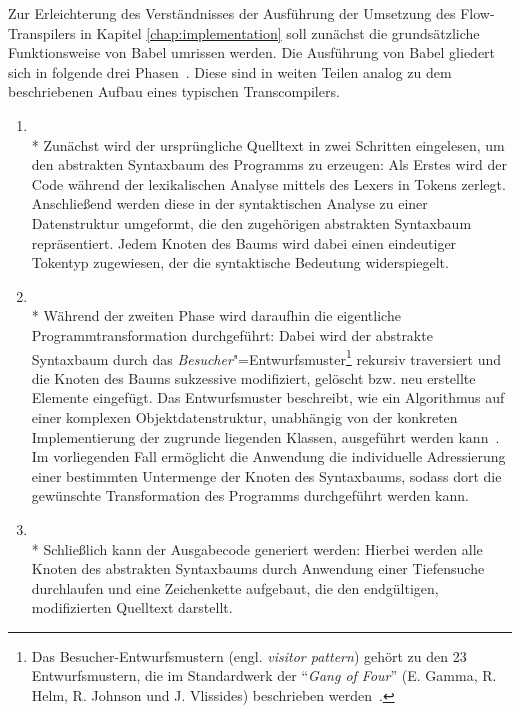 Zur Erleichterung des Verständnisses der Ausführung der Umsetzung des Flow-Transpilers in Kapitel \ref{chap:implementation} soll zunächst die grundsätzliche Funktionsweise von Babel umrissen werden. Die Ausführung von Babel gliedert sich in folgende drei Phasen~\autocite{BABEL:HANDBOOK}. Diese sind in weiten Teilen analog zu dem beschriebenen Aufbau eines typischen Transcompilers.

\begin{enumerate}
  \item {}\\*
    Zunächst wird der ursprüngliche Quelltext in zwei Schritten eingelesen, um den abstrakten Syntaxbaum des Programms zu erzeugen: Als Erstes wird der Code während der lexikalischen Analyse mittels des Lexers in Tokens zerlegt. Anschließend werden diese in der syntaktischen Analyse zu einer Datenstruktur umgeformt, die den zugehörigen abstrakten Syntaxbaum repräsentiert. Jedem Knoten des Baums wird dabei einen eindeutiger Tokentyp zugewiesen, der die syntaktische Bedeutung widerspiegelt.
    \bigbreak
  \item {}\\*
    Während der zweiten Phase wird daraufhin die eigentliche Programmtransformation durchgeführt: Dabei wird der abstrakte Syntaxbaum durch das \emph{Besucher}"=Entwurfsmuster\footnote{Das Besucher-Entwurfsmustern (engl. \textit{visitor pattern}) gehört zu den 23 Entwurfsmustern, die im Standardwerk  der \enquote{\textit{Gang of Four}} (E. Gamma, R. Helm, R. Johnson und J. Vlissides) beschrieben werden~\autocite[306\psqq]{GAMMA:1994}.} rekursiv traversiert und die Knoten des Baums sukzessive modifiziert, gelöscht bzw. neu erstellte Elemente eingefügt. Das Entwurfsmuster beschreibt, wie ein Algorithmus auf einer komplexen Objektdatenstruktur, unabhängig von der konkreten Implementierung der zugrunde liegenden Klassen, ausgeführt werden kann~\autocite[634\psq]{FREEMAN:2004}. Im vorliegenden Fall ermöglicht die Anwendung die individuelle Adressierung einer bestimmten Untermenge der Knoten des Syntaxbaums, sodass dort die gewünschte Transformation des Programms durchgeführt werden kann.
    \bigbreak
  \item {}\\*
    Schließlich kann der Ausgabecode generiert werden: Hierbei werden alle Knoten des abstrakten Syntaxbaums durch Anwendung einer Tiefensuche durchlaufen und eine Zeichenkette aufgebaut, die den endgültigen, modifizierten Quelltext darstellt.
\end{enumerate}

